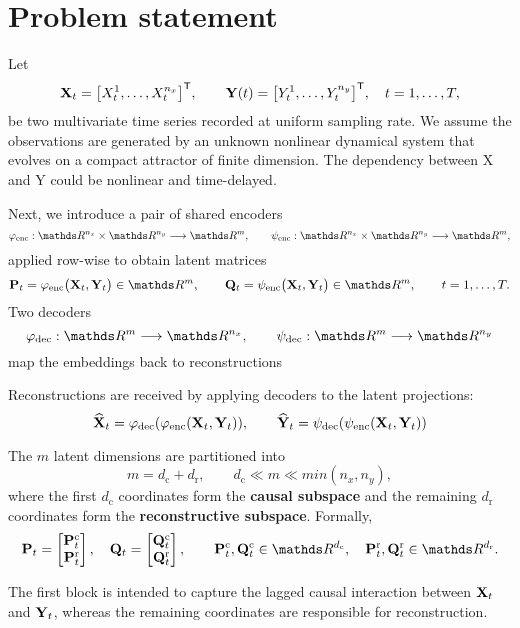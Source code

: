 \documentclass[14pt]{extarticle}
\begin{document}
	\section{Problem statement} \label{sec:problem}
	
	Let
	\[
	\mathbf X_t = \bigl[X_t^1, \ldots, X_t^{n_x}\bigr]^{\mathsf{T}}, \qquad \mathbf Y(t)=\bigl[Y_t^1, \dots, Y_t^{n_y}\bigr]^{\mathsf{T}},
	\quad t=1, \dots, T,
	\]
	be two multivariate time series recorded at uniform sampling rate.
	We assume the observations are generated by an unknown nonlinear dynamical system that evolves on a compact attractor of finite dimension. The dependency between X and Y could be nonlinear and time-delayed.
	
	Next, we introduce a pair of shared encoders  
	\[
	\varphi_{\text{enc}}:\dR^{n_x}\times \dR^{n_y} \longrightarrow \dR^{m},
	\qquad
	\psi_{\text{enc}}: \dR^{n_x}\times  \dR^{n_y} \longrightarrow \dR^{m},
	\]
	applied row-wise to obtain latent matrices  
	\[
	\bP_t=\varphi_{\text{enc}}\bigl(\bX_t, \bY_t\bigr) \in \dR^{m},
	\qquad
	\bQ_t=\psi_{\text{enc}} \bigl(\bX_t, \bY_t\bigr) \in \dR^{m},
	\qquad
	t=1,\dots ,T.
	\]
	Two decoders  
	\[
	\varphi_{\text{dec}}: \dR^{m} \longrightarrow \dR^{n_x},
	\qquad
	\psi_{\text{dec}}: \dR^{m} \longrightarrow \dR^{n_y}
	\]
	map the embeddings back to reconstructions 
	
	Reconstructions are received by applying decoders to the latent projections:
	\[
	\widehat {\mathbf{X}}_t = \varphi_{\text{dec}}(\varphi_{\text{enc}}(\mathbf{X}_t, \mathbf{Y}_t)),
	\qquad
	\widehat {\mathbf{Y}}_t = \psi_{\text{dec}}(\psi_{\text{enc}}(\mathbf{X}_t, \mathbf{Y}_t))
	\]
	
	The $m$ latent dimensions are partitioned into
	\[
	m=d_{\mathrm c}+d_{\mathrm r}, \qquad d_{\mathrm c}\ll m\ll min(n_x, n_y),
	\]
	where the first $d_{\mathrm c}$ coordinates form the \textbf{causal subspace} and the remaining $d_{\mathrm r}$ coordinates form the \textbf{reconstructive subspace}.  
	Formally,
	\[
	\bP_t=
	\begin{bmatrix}
		\bP_t^{\mathrm c} \\ \bP_t^{\mathrm r}
	\end{bmatrix},
	\quad
	\bQ_t=
	\begin{bmatrix}
		\bQ_t^{\mathrm c} \\ \bQ_t^{\mathrm r}
	\end{bmatrix},
	\qquad
	\bP_t^{\mathrm c}, \bQ_t^{\mathrm c} \in \dR^{d_{\mathrm c}},
	\quad
	\bP_t^{\mathrm r}, \bQ_t^{\mathrm r} \in \dR^{d_{\mathrm r}} .
	\]
	
	The first block is intended to capture the
	lagged causal interaction between $\mathbf{X}_t$ and $\mathbf{Y}_t$, whereas the remaining
	coordinates are responsible for reconstruction.
	
\end{document}
